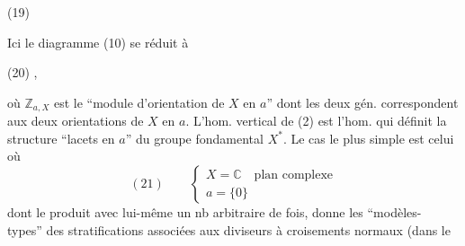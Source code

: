 \noindent (19)

Ici le diagramme (10) se réduit à

\noindent (20)
,

où $\mathbb Z_{a,X}$ est le ``module d'orientation de
$X$ en $a$'' dont les deux gén. correspondent
aux deux orientations de $X$ en $a$. L'hom.
vertical de (2) est l'hom. qui définit
la structure ``lacets en $a$'' du groupe
fondamental $X^*$. Le cas le plus
simple est celui où
\[
(21)\qquad\left\{\begin{array}{l}
X=\mathbb C\quad\text{plan complexe}\\
a=\{0\}
\end{array}\right.
\]
dont le produit avec lui-même un nb
arbitraire de fois, donne les ``modèles-
types'' des stratifications associées aux
diviseurs à croisements normaux (dans le

